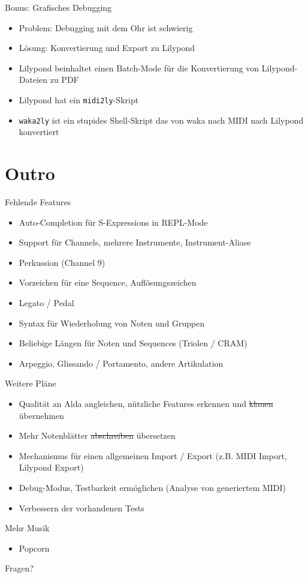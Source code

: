 \documentclass[presentation]{beamer}
\begin{document}
\begin{frame}[fragile,label=sec-4-20]{Bonus: Grafisches Debugging}
 \begin{itemize}
\item Problem: Debugging mit dem Ohr ist schwierig
\item Lösung: Konvertierung und Export zu Lilypond
\item Lilypond beinhaltet einen Batch-Mode für die Konvertierung von
Lilypond-Dateien zu PDF
\item Lilypond hat ein \texttt{midi2ly}-Skript
\item \texttt{waka2ly} ist ein stupides Shell-Skript das von waka nach MIDI nach
Lilypond konvertiert
\end{itemize}
\end{frame}

\section{Outro}
\label{sec-5}

\begin{frame}[label=sec-5-1]{Fehlende Features}
\begin{itemize}
\item Auto-Completion für S-Expressions in REPL-Mode
\item Support für Channels, mehrere Instrumente, Instrument-Aliase
\item Perkussion (Channel 9)
\item Vorzeichen für eine Sequence, Auflösungszeichen
\item Legato / Pedal
\item Syntax für Wiederholung von Noten und Gruppen
\item Beliebige Längen für Noten und Sequences (Triolen / CRAM)
\item Arpeggio, Glissando / Portamento, andere Artikulation
\end{itemize}
\end{frame}

\begin{frame}[label=sec-5-2]{Weitere Pläne}
\begin{itemize}
\item Qualität an Alda angleichen, nützliche Features erkennen und
\sout{klauen} übernehmen
\item Mehr Notenblätter \sout{abschreiben} übersetzen
\item Mechanismus für einen allgemeinen Import / Export (z.B. MIDI Import,
Lilypond Export)
\item Debug-Modus, Testbarkeit ermöglichen (Analyse von generiertem MIDI)
\item Verbessern der vorhandenen Tests
\end{itemize}
\end{frame}

\begin{frame}[label=sec-5-3]{Mehr Musik}
\begin{itemize}
\item Popcorn
\end{itemize}
\end{frame}

\begin{frame}[label=sec-5-4]{Fragen?}
\end{frame}
\end{document}
